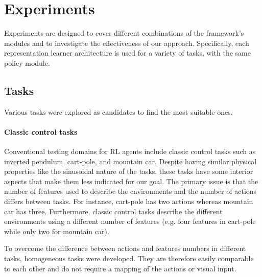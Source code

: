 \section{Experiments}
\label{sec:experiments}

Experiments are designed to cover different combinations of the framework's modules and to investigate the effectiveness of our approach. Specifically, each representation learner architecture is used for a variety of tasks, with the same policy module. 

\subsection{Tasks}
\label{sec:tasks}
Various tasks were explored as candidates to find the most suitable ones.


\paragraph{Classic control tasks} 
Conventional testing domains for RL agents include classic control tasks such as inverted pendulum, cart-pole, and mountain car.
Despite having similar physical properties like the sinusoidal nature of the tasks, these tasks have some interior aspects that make them less indicated for our goal. 
The primary issue is that the number of features used to describe the environments and the number of actions differs between tasks. For instance, cart-pole has two actions whereas mountain car has three. 
Furthermore, classic control tasks describe the different environments using a different number of features (e.g. four features in cart-pole while only two for mountain car).

To overcome the difference between actions and features numbers in different tasks, homogeneous tasks were developed. They are therefore easily comparable to each other and do not require a mapping of the actions or visual input. 



